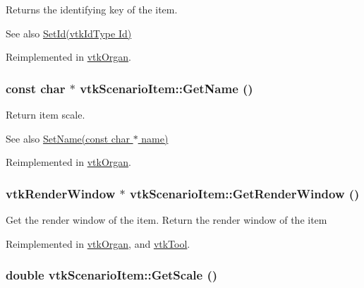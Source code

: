 Returns the identifying key of the item. \begin{DoxySeeAlso}{See also}
\hyperlink{classvtkScenarioItem_afd99a6db7187837d0129e9898478ec60}{SetId(vtkIdType Id)} 
\end{DoxySeeAlso}


Reimplemented in \hyperlink{classvtkOrgan_a8e45f79da9c4e7029492ced2f55c25ed}{vtkOrgan}.\hypertarget{classvtkScenarioItem_a41ebb204b2879d9dd14a392c1cb3c2fe}{
\subsubsection[{GetName}]{\setlength{\rightskip}{0pt plus 5cm}const char $\ast$ vtkScenarioItem::GetName ()}}
\label{classvtkScenarioItem_a41ebb204b2879d9dd14a392c1cb3c2fe}


Return item scale. \begin{DoxySeeAlso}{See also}
\hyperlink{classvtkScenarioItem_a199f87511e99386bb9f271d91c2d0caf}{SetName(const char $\ast$ name)} 
\end{DoxySeeAlso}


Reimplemented in \hyperlink{classvtkOrgan_a8421389b02b00b42b0899b75d00633b4}{vtkOrgan}.\hypertarget{classvtkScenarioItem_a9d7908b11d2a477827342c05bb505e66}{
\subsubsection[{GetRenderWindow}]{\setlength{\rightskip}{0pt plus 5cm}vtkRenderWindow $\ast$ vtkScenarioItem::GetRenderWindow ()}}
\label{classvtkScenarioItem_a9d7908b11d2a477827342c05bb505e66}


Get the render window of the item. Return the render window of the item 

Reimplemented in \hyperlink{classvtkOrgan_ae670e2727313073a9659a2795ce64c98}{vtkOrgan}, and \hyperlink{classvtkTool_ab156b5e1d4a9974b6b4a9809fdb10dc1}{vtkTool}.\hypertarget{classvtkScenarioItem_a136a346d222abe59fd63b2f4ced9b3fa}{
\subsubsection[{GetScale}]{\setlength{\rightskip}{0pt plus 5cm}double vtkScenarioItem::GetScale ()}}
\label{classvtkScenarioItem_a136a346d222abe59fd63b2f4ced9b3fa}


